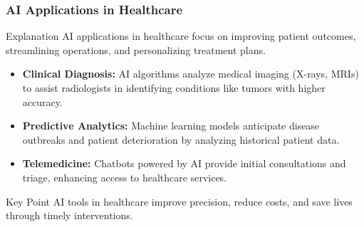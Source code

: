 \documentclass{beamer}
\begin{document}
\begin{frame}[fragile]
    \frametitle{AI Applications in Healthcare}
    \begin{block}{Explanation}
        AI applications in healthcare focus on improving patient outcomes, streamlining operations, and personalizing treatment plans.
    \end{block}
    \begin{itemize}
        \item \textbf{Clinical Diagnosis:} AI algorithms analyze medical imaging (X-rays, MRIs) to assist radiologists in identifying conditions like tumors with higher accuracy.
        \item \textbf{Predictive Analytics:} Machine learning models anticipate disease outbreaks and patient deterioration by analyzing historical patient data.
        \item \textbf{Telemedicine:} Chatbots powered by AI provide initial consultations and triage, enhancing access to healthcare services.
    \end{itemize}
    \begin{block}{Key Point}
        AI tools in healthcare improve precision, reduce costs, and save lives through timely interventions.
    \end{block}
\end{frame}
\end{document}
